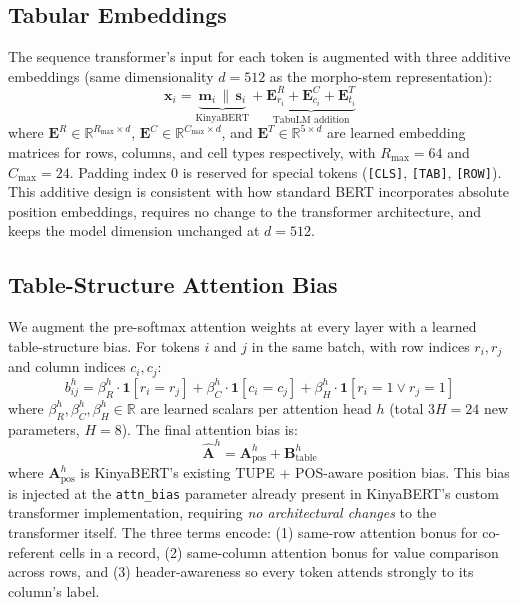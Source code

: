 \documentclass[11pt]{article}
\begin{document}
\subsection{Tabular Embeddings}
\label{sec:embeddings}

The sequence transformer's input for each token is augmented with three additive embeddings (same dimensionality $d=512$ as the morpho-stem representation):
\begin{equation}
\mathbf{x}_i = \underbrace{\mathbf{m}_i \,\|\, \mathbf{s}_i}_{\text{KinyaBERT}} + \underbrace{\mathbf{E}^R_{r_i} + \mathbf{E}^C_{c_i} + \mathbf{E}^T_{t_i}}_{\text{TabuLM addition}}
\end{equation}
where $\mathbf{E}^R \in \mathbb{R}^{R_{\max} \times d}$, $\mathbf{E}^C \in \mathbb{R}^{C_{\max} \times d}$, and $\mathbf{E}^T \in \mathbb{R}^{5 \times d}$ are learned embedding matrices for rows, columns, and cell types respectively, with $R_{\max}=64$ and $C_{\max}=24$.
Padding index 0 is reserved for special tokens (\texttt{[CLS]}, \texttt{[TAB]}, \texttt{[ROW]}).
This additive design is consistent with how standard BERT incorporates absolute position embeddings, requires no change to the transformer architecture, and keeps the model dimension unchanged at $d=512$.

\subsection{Table-Structure Attention Bias}
\label{sec:attn_bias}

We augment the pre-softmax attention weights at every layer with a learned table-structure bias.
For tokens $i$ and $j$ in the same batch, with row indices $r_i, r_j$ and column indices $c_i, c_j$:
\begin{equation}
b^h_{ij} = \beta^h_R \cdot \mathbf{1}[r_i = r_j]
           + \beta^h_C \cdot \mathbf{1}[c_i = c_j]
           + \beta^h_H \cdot \mathbf{1}[r_i=1 \lor r_j=1]
\end{equation}
where $\beta^h_R, \beta^h_C, \beta^h_H \in \mathbb{R}$ are learned scalars per attention head $h$ (total $3H=24$ new parameters, $H=8$).
The final attention bias is:
\begin{equation}
\hat{\mathbf{A}}^h = \mathbf{A}^h_{\text{pos}} + \mathbf{B}^h_{\text{table}}
\end{equation}
where $\mathbf{A}^h_{\text{pos}}$ is KinyaBERT's existing TUPE + POS-aware position bias.
This bias is injected at the \texttt{attn\_bias} parameter already present in KinyaBERT's custom transformer implementation, requiring \emph{no architectural changes} to the transformer itself.
The three terms encode: (1) same-row attention bonus for co-referent cells in a record, (2) same-column attention bonus for value comparison across rows, and (3) header-awareness so every token attends strongly to its column's label.
\end{document}
